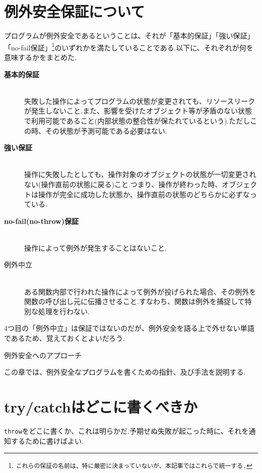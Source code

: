 \documentclass[a4j,11pt,openright]{jsbook}
\makeatletter
\renewcommand{\chapter}{\@startsection {chapter}{1}{\z@}{-3.5ex \@plus -1ex \@minus -.2ex}{2.3ex \@plus.2ex}
{\normalfont\LARGE\bfseries}}
\makeatother
\begin{document}
\section{例外安全保証について}

プログラムが例外安全であるということは、それが「基本的保証」「強い保証」「no-fail保証」\footnote{\texttt{これらの保証の名前は、特に厳密に決まっていないが、本記事ではこれらで統一する.}}のいずれかを満たしていることである.以下に、それぞれが何を意味するかをまとめた.

\begin{description}
  \item[\textbf{基本的保証}]\mbox{}\\
    失敗した操作によってプログラムの状態が変更されても、リソースリークが発生しないこと.また、影響を受けたオブジェクト等が矛盾のない状態で利用可能であること(内部状態の整合性が保たれているという).ただしこの時、その状態が予測可能である必要はない.
  \item[\textbf{強い保証}]\mbox{}\\
    操作に失敗したとしても、操作対象のオブジェクトの状態が一切変更されない(操作直前の状態に戻る)こと.つまり、操作が終わった時、オブジェクトは操作が完全に成功した状態か、操作直前の状態のどちらかに必ずなっている.
  \item[\textbf{no-fail(no-throw)保証}]\mbox{}\\
    操作によって例外が発生することはないこと.
  \item[例外中立]\mbox{}\\
    ある関数内部で行われた操作によって例外が投げられた場合、その例外を関数の呼び出し元に伝播させること.すなわち、関数は例外を捕捉して特別な処理を行わない.
\end{description}

4つ目の「例外中立」は保証ではないのだが、例外安全を語る上で外せない単語であるため、覚えておくとよいだろう.

\chapter{例外安全へのアプローチ}

この章では、例外安全なプログラムを書くための指針、及び手法を説明する.

\section{try/catchはどこに書くべきか}

\verb|throw|をどこに書くか、これは明らかだ.予期せぬ失敗が起こった時に、それを通知するために書けばよい.
\end{document}
